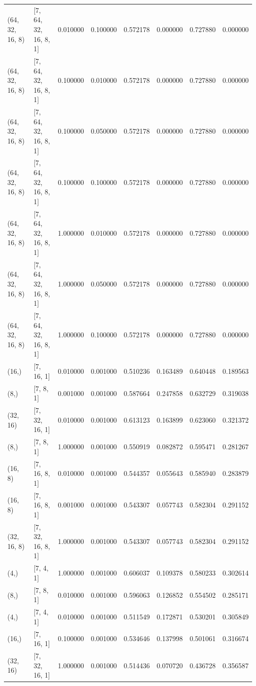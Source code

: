 \begin{tabular}{llrrrrrr}
(64, 32, 16, 8) & [7, 64, 32, 16, 8, 1] & 0.010000 & 0.100000 & 0.572178 & 0.000000 & 0.727880 & 0.000000 \\
(64, 32, 16, 8) & [7, 64, 32, 16, 8, 1] & 0.100000 & 0.010000 & 0.572178 & 0.000000 & 0.727880 & 0.000000 \\
(64, 32, 16, 8) & [7, 64, 32, 16, 8, 1] & 0.100000 & 0.050000 & 0.572178 & 0.000000 & 0.727880 & 0.000000 \\
(64, 32, 16, 8) & [7, 64, 32, 16, 8, 1] & 0.100000 & 0.100000 & 0.572178 & 0.000000 & 0.727880 & 0.000000 \\
(64, 32, 16, 8) & [7, 64, 32, 16, 8, 1] & 1.000000 & 0.010000 & 0.572178 & 0.000000 & 0.727880 & 0.000000 \\
(64, 32, 16, 8) & [7, 64, 32, 16, 8, 1] & 1.000000 & 0.050000 & 0.572178 & 0.000000 & 0.727880 & 0.000000 \\
(64, 32, 16, 8) & [7, 64, 32, 16, 8, 1] & 1.000000 & 0.100000 & 0.572178 & 0.000000 & 0.727880 & 0.000000 \\
(16,) & [7, 16, 1] & 0.010000 & 0.001000 & 0.510236 & 0.163489 & 0.640448 & 0.189563 \\
(8,) & [7, 8, 1] & 0.001000 & 0.001000 & 0.587664 & 0.247858 & 0.632729 & 0.319038 \\
(32, 16) & [7, 32, 16, 1] & 0.010000 & 0.001000 & 0.613123 & 0.163899 & 0.623060 & 0.321372 \\
(8,) & [7, 8, 1] & 1.000000 & 0.001000 & 0.550919 & 0.082872 & 0.595471 & 0.281267 \\
(16, 8) & [7, 16, 8, 1] & 0.010000 & 0.001000 & 0.544357 & 0.055643 & 0.585940 & 0.283879 \\
(16, 8) & [7, 16, 8, 1] & 0.001000 & 0.001000 & 0.543307 & 0.057743 & 0.582304 & 0.291152 \\
(32, 16, 8) & [7, 32, 16, 8, 1] & 1.000000 & 0.001000 & 0.543307 & 0.057743 & 0.582304 & 0.291152 \\
(4,) & [7, 4, 1] & 1.000000 & 0.001000 & 0.606037 & 0.109378 & 0.580233 & 0.302614 \\
(8,) & [7, 8, 1] & 0.010000 & 0.001000 & 0.596063 & 0.126852 & 0.554502 & 0.285171 \\
(4,) & [7, 4, 1] & 0.010000 & 0.001000 & 0.511549 & 0.172871 & 0.530201 & 0.305849 \\
(16,) & [7, 16, 1] & 0.100000 & 0.001000 & 0.534646 & 0.137998 & 0.501061 & 0.316674 \\
(32, 16) & [7, 32, 16, 1] & 1.000000 & 0.001000 & 0.514436 & 0.070720 & 0.436728 & 0.356587 \\

\end{tabular}
